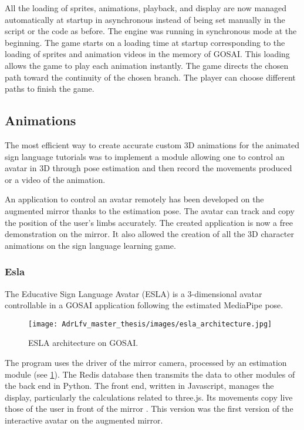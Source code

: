 All the loading of sprites, animations, playback, and display are now managed automatically at startup in asynchronous instead of being set manually in the script or the code as before. The engine was running in synchronous mode at the beginning. The game starts on a loading time at startup corresponding to the loading of sprites and animation videos in the memory of GOSAI. This loading allows the game to play each animation instantly. The game directs the chosen path toward the continuity of the chosen branch. The player can choose different paths to finish the game.

\subsection{Animations}

The most efficient way to create accurate custom 3D animations for the animated sign language tutorials was to implement a module allowing one to control an avatar in 3D through pose estimation and then record the movements produced or a video of the animation.

An application to control an avatar remotely has been developed on the augmented mirror thanks to the estimation pose. The avatar can track and copy the position of the user's limbs accurately. The created application is now a free demonstration on the mirror. It also allowed the creation of all the 3D character animations on the sign language learning game.

\subsubsection{Esla}

The Educative Sign Language Avatar (ESLA) is a 3-dimensional avatar controllable in a GOSAI application following the estimated MediaPipe pose. 

\begin{figure}[h]
    \centering
    \texttt{[image: AdrLfv\_master\_thesis/images/esla\_architecture.jpg]}
    \caption{ESLA architecture on GOSAI.}
    \label{fig:esla_architecture}
\end{figure}

The program uses the driver of the mirror camera, processed by an estimation module (see \ref{fig:esla_architecture}). The Redis database then transmits the data to other modules of the back end in Python. The front end, written in Javascript, manages the display, particularly the calculations related to three.js. Its movements copy live those of the user in front of the mirror \cite{esla}. This version was the first version of the interactive avatar on the augmented mirror.


